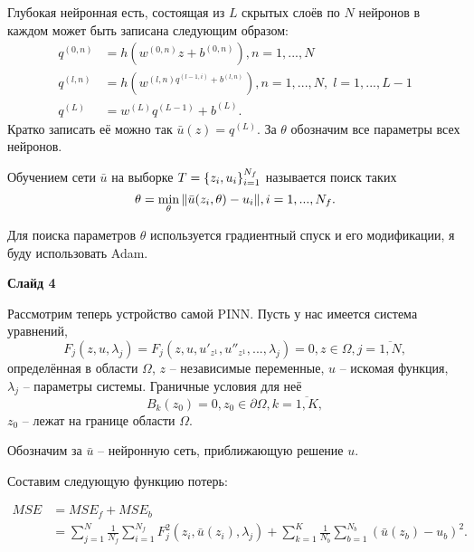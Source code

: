 \documentclass[a4paper,14pt]{extarticle} %
\begin{document}
Глубокая нейронная есть, состоящая из $L$ скрытых слоёв по $N$ нейронов в каждом может быть записана следующим образом:
\begin{equation*}
    \begin{aligned}
        q^{(0, n)} & = h(w^{(0,n)}z + b^{(0,n)}), n=1,...,N\\
        q^{(l, n)} & = h(w^{(l,n) q^{(l-1,i)} + b^{(l,n)}}), n=1,...,N,\; l=1,...,L-1 \\
        q^{(L)}    & = w^{(L)}q^{(L-1)}+b^{(L)}.
    \end{aligned}
\end{equation*}
Кратко записать её можно так $\bar{u}(z) = q^{(L)}$. За $\theta$ обозначим все параметры всех нейронов.

Обучением сети $\bar{u}$ на выборке $T = {\left\{ z_i, u_i \right\}}_{i=1}^{N_f}$ называется поиск таких 
\begin{equation*}
    \theta=\min_\theta{\left\lVert \bar{u}(z_i,\theta)-u_i \right\rVert}, i=1, ..., N_f.
\end{equation*}

Для поиска параметров $\theta$ используется градиентный спуск и его модификации, я буду использовать Adam.

\textbf{Слайд 4}

Рассмотрим теперь устройство самой PINN. Пусть у нас имеется система уравнений, 
\begin{equation*}\label{eq:1syst}
    F_j(z, u, \lambda_j) = F_j(z, u, u'_{z^1}, u''_{z^1}, ..., \lambda_j) = 0, z\in\Omega, j=\overline{1,N},
\end{equation*}
определённая в области $\Omega$, $z$ -- независимые переменные, $u$ -- искомая функция, $\lambda_j$ -- параметры системы.
Граничные условия для неё
\begin{equation*}\label{eq:1bnd}
    B_k(z_0) = 0, z_0 \in \partial\Omega, k=\overline{1,K},
\end{equation*}
$z_0$ -- лежат на границе области $\Omega$.

Обозначим за $\bar{u}$ -- нейронную сеть, приближающую решение $u$.

Составим следующую функцию потерь:

\begin{equation*} \label{eq:pinn_loss}
    \begin{aligned}
        MSE & = MSE_f + MSE_b \\
            & = \sum_{j=1}^N\frac{1}{N_f}\sum_{i=1}^{N_f} F_j^2(z_i, \bar{u}(z_i), \lambda_j) + \sum_{k=1}^{K}\frac{1}{N_b}\sum_{b=1}^{N_b} (\bar{u}(z_b) - u_b)^2.
    \end{aligned}
\end{equation*}
\end{document}
